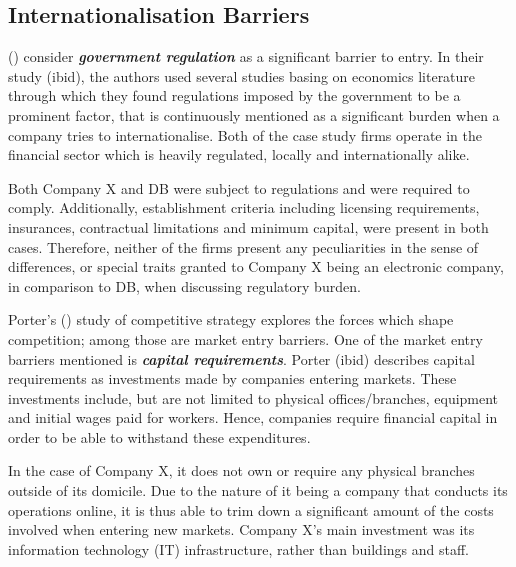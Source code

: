 \documentclass[11pt,a4paper]{article}
\begin{document}
{{{\subsection{Internationalisation Barriers}
\vspace{-1mm}
\label{int_barriers}
 \par



 \citeauthor{karakayaBarriersEntryMarket1989} (\citeyear{karakayaBarriersEntryMarket1989}) consider \textbf{\textit{government regulation}} as a significant barrier to entry. In their study (ibid), the authors used several studies basing on economics literature through which they found regulations imposed by the government to be a prominent factor, that is continuously mentioned as a significant burden when a company tries to internationalise. Both of the case study firms operate in the financial sector which is heavily regulated, locally and internationally alike. \par
Both Company X and DB were subject to regulations and were required to comply. Additionally, establishment criteria including licensing requirements, insurances, contractual limitations and minimum capital, were present in both cases. Therefore, neither of the firms present any peculiarities in the sense of differences, or special traits granted to Company X being an electronic company, in comparison to DB, when discussing regulatory burden. \par
Porter's (\citeyear{porterCompetitiveStrategyTechniques1980}) study of competitive strategy explores the forces which shape competition; among those are market entry barriers. One of the market entry barriers mentioned is \textbf{\textit{capital requirements}}. Porter (ibid) describes capital requirements as investments made by companies entering markets. These investments include, but are not limited to physical offices/branches, equipment and initial wages paid for workers. Hence, companies require financial capital in order to be able to withstand these expenditures. \par
In the case of Company X, it does not own or require any physical branches outside of its domicile. Due to the nature of it being a company that conducts its operations online, it is thus able to trim down a significant amount of the costs involved when entering new markets. Company X's main investment was its information technology (IT) infrastructure, rather than buildings and staff.  \par
}}}
\end{document}

